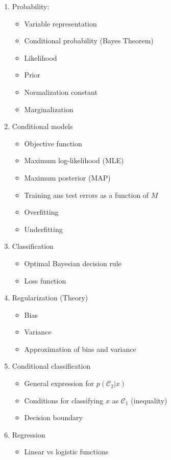 \documentclass[12pt,a4paper]{article}
\newcommand{\class}{\mathcal{C}}
\begin{document}
	\begin{enumerate}
		\item Probability:
			\begin{itemize}
				\item Variable representation
				\item Conditional probability (Bayes Theorem)
				\item Likelihood
				\item Prior
				\item Normalization constant
				\item Marginalization
			\end{itemize}
				\item Conditional models
				\begin{itemize}
					\item Objective function
					\item Maximum log-likelihood (MLE)
					\item Maximum posterior (MAP)
					\item Training ans test errors as a function of $M$
					\item Overfitting
					\item Underfitting				
				\end{itemize}
		\item Classification
			\begin{itemize}
				\item Optimal Bayesian decision rule
				\item Loss function
			\end{itemize}
		\item Regularization (Theory)
			\begin{itemize}
				\item Bias
				\item Variance
				\item Approximation of bias and variance
			\end{itemize}
		\item Conditional classification
			\begin{itemize}
				\item General expression for $p(\class_2 | x)$
				\item Conditions for classifying $x$ as $\class_1$ (inequality)
				\item Decision boundary
			\end{itemize}
		\item Regression
			\begin{itemize}
				\item Linear vs logistic functions

\end{itemize}
\end{enumerate}
\end{document}

